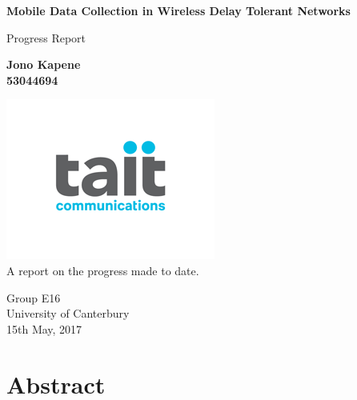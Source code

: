 \documentclass[a4paper,12pt]{article}
\begin{document}
	\begin{titlepage}
    		\begin{center}
        		\vspace*{1cm}
        
        		\textbf{Mobile Data Collection in Wireless Delay Tolerant Networks}
        
        		\vspace{0.5cm}
        		Progress Report
        
        		\vspace{1.5cm}
        
        		\textbf{Jono Kapene \\ 53044694}
        
        		\vfill
        		\includegraphics[scale=0.8]{Tait-Communications-logo.png}\\
        		A report on the progress made to date.
        		
        		\vspace{0.8cm}
        
        		Group E16\\
        		University of Canterbury\\
        		15th May, 2017
        
    \end{center}
\end{titlepage}
	\clearpage
	\tableofcontents
	\clearpage
	
	
\section{Abstract}
\clearpage
\end{document}
